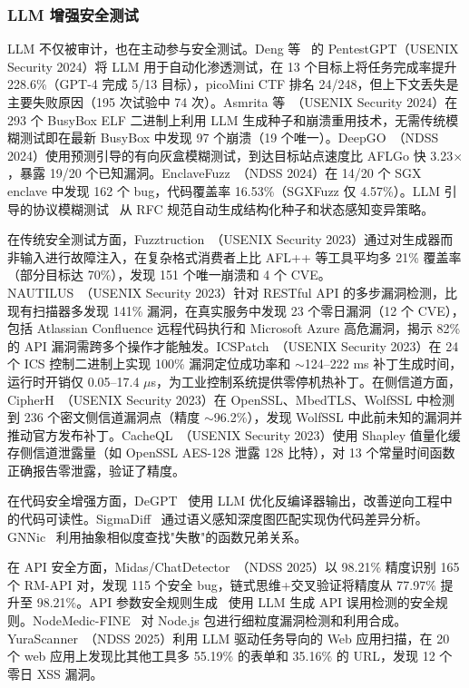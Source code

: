 \documentclass[11pt,a4paper,onecolumn]{article}
\begin{document}
\subsubsection{LLM 增强安全测试}
LLM 不仅被审计，也在主动参与安全测试。Deng 等~\cite{deng2024pentestgpt} 的 PentestGPT（USENIX Security 2024）将 LLM 用于自动化渗透测试，在 13 个目标上将任务完成率提升 228.6\%（GPT-4 完成 5/13 目标），picoMini CTF 排名 24/248，但上下文丢失是主要失败原因（195 次试验中 74 次）。Asmrita 等~\cite{asmrita2024busybox}（USENIX Security 2024）在 293 个 BusyBox ELF 二进制上利用 LLM 生成种子和崩溃重用技术，无需传统模糊测试即在最新 BusyBox 中发现 97 个崩溃（19 个唯一）。DeepGO~\cite{deepgo2024}（NDSS 2024）使用预测引导的有向灰盒模糊测试，到达目标站点速度比 AFLGo 快 3.23$\times$，暴露 19/20 个已知漏洞。EnclaveFuzz~\cite{enclavefuzz2024}（NDSS 2024）在 14/20 个 SGX enclave 中发现 162 个 bug，代码覆盖率 16.53\%（SGXFuzz 仅 4.57\%）。LLM 引导的协议模糊测试~\cite{llm_protocol_fuzz_2024} 从 RFC 规范自动生成结构化种子和状态感知变异策略。

在传统安全测试方面，Fuzztruction~\cite{bars2023fuzztruction}（USENIX Security 2023）通过对生成器而非输入进行故障注入，在复杂格式消费者上比 AFL++ 等工具平均多 21\% 覆盖率（部分目标达 70\%），发现 151 个唯一崩溃和 4 个 CVE。NAUTILUS~\cite{deng2023nautilus}（USENIX Security 2023）针对 RESTful API 的多步漏洞检测，比现有扫描器多发现 141\% 漏洞，在真实服务中发现 23 个零日漏洞（12 个 CVE），包括 Atlassian Confluence 远程代码执行和 Microsoft Azure 高危漏洞，揭示 82\% 的 API 漏洞需跨多个操作才能触发。ICSPatch~\cite{rajput2023icspatch}（USENIX Security 2023）在 24 个 ICS 控制二进制上实现 100\% 漏洞定位成功率和 $\sim$124--222 ms 补丁生成时间，运行时开销仅 0.05--17.4 $\mu$s，为工业控制系统提供零停机热补丁。在侧信道方面，CipherH~\cite{deng2023cipherh}（USENIX Security 2023）在 OpenSSL、MbedTLS、WolfSSL 中检测到 236 个密文侧信道漏洞点（精度 $\sim$96.2\%），发现 WolfSSL 中此前未知的漏洞并推动官方发布补丁。CacheQL~\cite{yuan2023cacheql}（USENIX Security 2023）使用 Shapley 值量化缓存侧信道泄露量（如 OpenSSL AES-128 泄露 128 比特），对 13 个常量时间函数正确报告零泄露，验证了精度。

在代码安全增强方面，DeGPT~\cite{degpt2024} 使用 LLM 优化反编译器输出，改善逆向工程中的代码可读性。SigmaDiff~\cite{sigmadiff2024} 通过语义感知深度图匹配实现伪代码差异分析。GNNic~\cite{gnnic2024} 利用抽象相似度查找"失散"的函数兄弟关系。

在 API 安全方面，Midas/ChatDetector~\cite{midas2025}（NDSS 2025）以 98.21\% 精度识别 165 个 RM-API 对，发现 115 个安全 bug，链式思维+交叉验证将精度从 77.97\% 提升至 98.21\%。API 参数安全规则生成~\cite{api_rules2025} 使用 LLM 生成 API 误用检测的安全规则。NodeMedic-FINE~\cite{song2025nodemedic} 对 Node.js 包进行细粒度漏洞检测和利用合成。YuraScanner~\cite{yurascanner2025}（NDSS 2025）利用 LLM 驱动任务导向的 Web 应用扫描，在 20 个 web 应用上发现比其他工具多 55.19\% 的表单和 35.16\% 的 URL，发现 12 个零日 XSS 漏洞。
\end{document}
